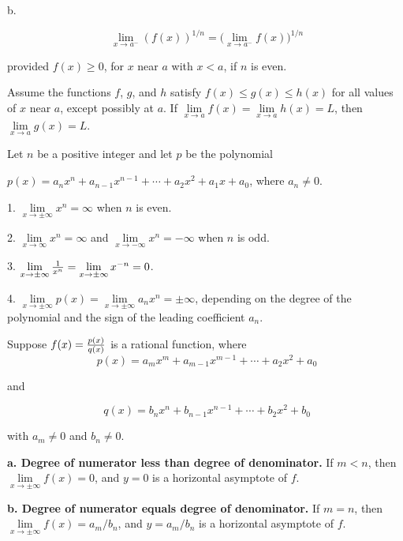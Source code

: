 \par b.

$$\
\lim_{x \to a^-}(f(x))^{1/n} =
\bigg(
\lim_{x \to a^-} f(x)
\bigg)^{1/n}
$$

provided $f(x) \ge 0$, for $x$ near $a$ with $x < a$, if $n$ is even.

\endthm

Assume the functions $f$, $g$, and $h$ satisfy $f(x) \le g(x) \le h(x)$
for all values of $x$ near $a$, except possibly at $a$.
If $\lim\limits_{x \to a} f(x) = \lim\limits_{x \to a} h(x) = L$,
then $\lim\limits_{x \to a} g(x) = L$.
\endthm

Let $n$ be a positive integer and let $p$ be the polynomial

$p(x) = a_n x^n + a_{n - 1}x^{n - 1} + \cdots + a_2 x^2 +
a_1x + a_0$, where $a_n \ne 0$.
\par 1.
$\lim\limits_{x \to \pm\infty} x^n = \infty$ when $n$ is even.

\par 2.
$\lim\limits_{x \to \infty} x^n = \infty$
and
$\lim\limits_{x \to -\infty} x^n = -\infty$
when $n$ is odd.

\par 3.
$\lim\limits_{x \to \pm\infty} {1 \over x^n} =
\lim\limits_{x \to \pm\infty} {x^{-n}} = 0
$.

\par 4.
$\lim\limits_{x \to \pm\infty} p(x)=
\lim\limits_{x \to \pm\infty} a_nx^n= \pm\infty$,
depending on the degree of the polynomial and the sign
of the leading coefficient $a_n$.

\endthm

Suppose $f(x) = {p(x) \over q(x)}$ is a rational function,
where
$$\
p(x) = a_mx^m + a_{m-1}x^{m-1} + \cdots + a_2x^2 + a_0
$$

and

$$\
q(x) = b_nx^n + b_{n-1}x^{n-1} + \cdots + b_2x^2 + b_0
$$

with $a_m \ne 0$ and $b_n \ne 0$.

\par {\bf a. Degree of numerator less than degree of denominator.}
If $m < n$, then $\lim\limits_{x \to \pm\infty} f(x) = 0$,
and $y = 0$ is a horizontal asymptote of $f$.

\par {\bf b. Degree of numerator equals degree of denominator.}
If $m = n$, then $\lim\limits_{x \to \pm\infty} f(x) = a_m/b_n$,
and $y = a_m/b_n$ is a horizontal asymptote of $f$.

